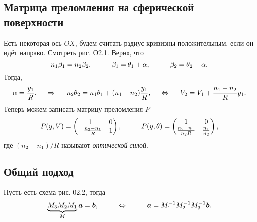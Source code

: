 \subsection{Матрица преломления на сферической поверхности}

Есть некоторая ось $OX$, будем считать радиус кривизны положительным, если он идёт направо. Смотреть рис. О2.1. Верно, что
\begin{equation*}
    n_1 \beta_1 = n_2 \beta_2,
    \hspace{1 cm}
    \beta_1 = \theta_1 + \alpha, 
    \hspace{1 cm}
    \beta_2 = \theta_2 + \alpha.
\end{equation*}
Тогда,
\begin{equation*}
    \alpha = \frac{y_1}{R}, 
    \hspace{0.5cm} \Rightarrow \hspace{0.5cm}   
    n_2 \theta_2 = n_1 \theta_1 + (n_1 - n_2) \frac{y_1}{R},
    \hspace{0.5cm} \Leftrightarrow \hspace{0.5cm}
    V_2 = V_1 + \frac{n_1-n_2}{R} y_1.
\end{equation*}
Теперь можем записать матрицу преломления $P$
\begin{equation}
    P(y, V) = \begin{pmatrix}
        1 & 0 \\
        -\frac{n_2-n_1}{R} & 1 \\
    \end{pmatrix},
    \hspace{1 cm}
    P(y, \theta) = 
    \begin{pmatrix}
        1 & 0 \\
        \frac{n_2-n_1}{n_2 R} & \frac{n_1}{n_2} \\
    \end{pmatrix},
\end{equation}
где $(n_2-n_1)/R$ называют \textit{оптической силой}.


\subsection{Общий подход}

Пусть есть  схема рис. 02.2, тогда
\begin{equation*}
    \underbrace{M_3 M_2 M_1}_{M} \mbox{\boldmath $a$} = \mbox{\boldmath $b$},
    \hspace{1 cm}
    \Leftrightarrow
    \hspace{1 cm}
    \mbox{\boldmath $a$} = M_1^{-1} M_2^{-1} M_3^{-1} \mbox{\boldmath $b$}.
\end{equation*}

